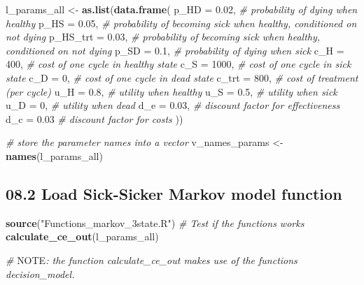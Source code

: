 \documentclass[]{article}
\newenvironment{Shaded}{\begin{snugshade}}{\end{snugshade}}
\newcommand{\KeywordTok}[1]{\textcolor[rgb]{0.13,0.29,0.53}{\textbf{#1}}}
\newcommand{\DataTypeTok}[1]{\textcolor[rgb]{0.13,0.29,0.53}{#1}}
\newcommand{\DecValTok}[1]{\textcolor[rgb]{0.00,0.00,0.81}{#1}}
\newcommand{\FloatTok}[1]{\textcolor[rgb]{0.00,0.00,0.81}{#1}}
\newcommand{\StringTok}[1]{\textcolor[rgb]{0.31,0.60,0.02}{#1}}
\newcommand{\CommentTok}[1]{\textcolor[rgb]{0.56,0.35,0.01}{\textit{#1}}}
\newcommand{\AlertTok}[1]{\textcolor[rgb]{0.94,0.16,0.16}{#1}}
\newcommand{\NormalTok}[1]{#1}
\begin{document}
\begin{Shaded}
\begin{Highlighting}[]
\NormalTok{l_params_all <-}\StringTok{ }\KeywordTok{as.list}\NormalTok{(}\KeywordTok{data.frame}\NormalTok{(}
  \DataTypeTok{p_HD     =} \FloatTok{0.02}\NormalTok{,  }\CommentTok{# probability of dying when healthy}
  \DataTypeTok{p_HS     =} \FloatTok{0.05}\NormalTok{,  }\CommentTok{# probability of becoming sick when healthy, conditioned on not dying}
  \DataTypeTok{p_HS_trt =} \FloatTok{0.03}\NormalTok{,  }\CommentTok{# probability of becoming sick when healthy, conditioned on not dying}
  \DataTypeTok{p_SD     =} \FloatTok{0.1}\NormalTok{,   }\CommentTok{# probability of dying when sick}
  \DataTypeTok{c_H      =} \DecValTok{400}\NormalTok{,   }\CommentTok{# cost of one cycle in healthy state}
  \DataTypeTok{c_S      =} \DecValTok{1000}\NormalTok{,  }\CommentTok{# cost of one cycle in sick state}
  \DataTypeTok{c_D      =} \DecValTok{0}\NormalTok{,     }\CommentTok{# cost of one cycle in dead state}
  \DataTypeTok{c_trt    =} \DecValTok{800}\NormalTok{,   }\CommentTok{# cost of treatment (per cycle)}
  \DataTypeTok{u_H      =} \FloatTok{0.8}\NormalTok{,   }\CommentTok{# utility when healthy }
  \DataTypeTok{u_S      =} \FloatTok{0.5}\NormalTok{,   }\CommentTok{# utility when sick}
  \DataTypeTok{u_D      =} \DecValTok{0}\NormalTok{,     }\CommentTok{# utility when dead}
  \DataTypeTok{d_e      =} \FloatTok{0.03}\NormalTok{,  }\CommentTok{# discount factor for effectiveness}
  \DataTypeTok{d_c      =} \FloatTok{0.03}   \CommentTok{# discount factor for costs}
\NormalTok{))}

\CommentTok{# store the parameter names into a vector}
\NormalTok{v_names_params <-}\StringTok{ }\KeywordTok{names}\NormalTok{(l_params_all)}
\end{Highlighting}
\end{Shaded}

\subsection{08.2 Load Sick-Sicker Markov model
function}\label{load-sick-sicker-markov-model-function}

\begin{Shaded}
\begin{Highlighting}[]
\KeywordTok{source}\NormalTok{(}\StringTok{"Functions_markov_3state.R"}\NormalTok{)}
\CommentTok{# Test if the functions works}
\KeywordTok{calculate_ce_out}\NormalTok{(l_params_all) }

\CommentTok{# }\AlertTok{NOTE}\CommentTok{: the function calculate_ce_out makes use of the functions decision_model. }
\end{Highlighting}
\end{Shaded}
\end{document}
